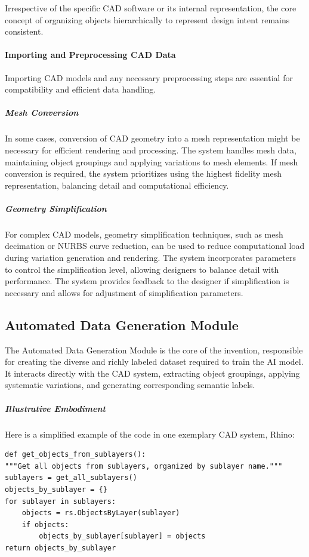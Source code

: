 \documentclass[12pt]{article}
\begin{document}
Irrespective of the specific CAD software or its internal representation, the core concept of organizing objects hierarchically to represent design intent remains consistent.



\paragraph{Importing and Preprocessing CAD Data}
Importing CAD models and any necessary preprocessing steps are essential for compatibility and efficient data handling.

\subparagraph{Mesh Conversion}

In some cases, conversion of CAD geometry into a mesh representation might be necessary for efficient rendering and processing. The system handles mesh data, maintaining object groupings and applying variations to mesh elements. If mesh conversion is required, the system prioritizes using the highest fidelity mesh representation, balancing detail and computational efficiency.

\subparagraph{Geometry Simplification}
For complex CAD models, geometry simplification techniques, such as mesh decimation or NURBS curve reduction, can be used to reduce computational load during variation generation and rendering. The system incorporates parameters to control the simplification level, allowing designers to balance detail with performance. The system provides feedback to the designer if simplification is necessary and allows for adjustment of simplification parameters.

\subsection{Automated Data Generation Module}

The Automated Data Generation Module is the core of the invention, responsible for creating the diverse and richly labeled dataset required to train the AI model. It interacts directly with the CAD system, extracting object groupings, applying systematic variations, and generating corresponding semantic labels.


\subparagraph{Illustrative Embodiment} 

Here is a simplified example of the code in one exemplary CAD system, Rhino:

\begin{verbatim}
def get_objects_from_sublayers():
"""Get all objects from sublayers, organized by sublayer name."""
sublayers = get_all_sublayers()
objects_by_sublayer = {}
for sublayer in sublayers:
    objects = rs.ObjectsByLayer(sublayer)
    if objects:
        objects_by_sublayer[sublayer] = objects
return objects_by_sublayer

\end{verbatim}  
\end{document}
